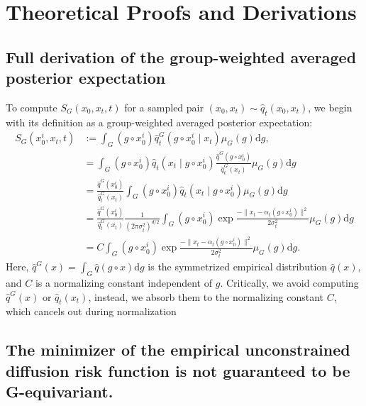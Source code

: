 

\section{Theoretical Proofs and Derivations}

\subsection{Full derivation of the group-weighted averaged posterior expectation}
\label{sub_app:SFull}

To compute \( S_G(x_0, x_t, t) \) for a sampled pair \((x_0, x_t) \sim \hat{q}_t(x_0, x_t)\), we begin with its definition as a group-weighted averaged posterior expectation:
\begin{align}
    S_G(x_0^i, x_t, t) &:= \int_G (g \circ x_0^i) \hat{q}^G_t(g \circ x_0^i \mid x_t) \mu_G(g) \mathrm{d} g , \\
    &= \int_G (g \circ x_0^i) \hat{q}_t(x_t \mid g \circ x_0^i) \frac{\hat{q}^G(g \circ x_0^i)}{\hat{q}^G_t(x_t)} \mu_G(g) \mathrm{d} g \\
    &= \frac{\hat{q}^G(x_0^i)}{\hat{q}^G_t(x_t)} \int_G (g \circ x_0^i) \hat{q}_t(x_t \mid g \circ x_0^i)  \mu_G(g) \mathrm{d} g \\
    &= \frac{\hat{q}^G(x_0^i)}{\hat{q}^G_t(x_t)} \frac{1}{(2\pi\sigma_t^2)^{d/2}} \int_G (g \circ x_0^i) \exp{\frac{-\| x_t - \alpha_t (g \circ x_0^i) \|^2}{2\sigma_t^2}} \mu_G(g) \mathrm{d}g \\
    &= C \int_G (g \circ x_0^i) \exp{\frac{-\| x_t - \alpha_t (g \circ x_0^i) \|^2}{2\sigma_t^2}} \mu_G(g) \mathrm{d}g .
\end{align}
Here, \(\hat{q}^G(x) = \int_G \hat{q}(g \circ x)\mathrm{d}g \) is the symmetrized empirical distribution \(\hat{q}(x)\), and \(C\) is a normalizing constant independent of \(g\). Critically, we avoid computing \(\hat{q}^G(x)\) or \(\hat{q}_t(x_t)\), instead, we absorb them to the normalizing constant \(C\), which cancels out during normalization

\subsection{The minimizer of the empirical unconstrained diffusion risk function is not guaranteed to be G-equivariant.}
\label{sub_app:mini}

